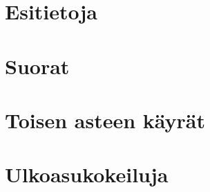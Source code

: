 \chapter{Esitietoja}
	
	
	
	

\chapter{Suorat}
	
	
	
	

\chapter{Toisen asteen käyrät}
	
	
	
	
	
	
	
	

\chapter{Ulkoasukokeiluja}
	
